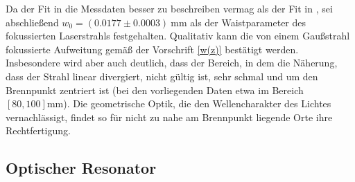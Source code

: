 \documentclass[11pt,a4paper,oneside]{scrartcl}
\begin{document}
Da der Fit in  die Messdaten besser zu beschreiben vermag als  der Fit in , sei abschließend $w_0=(0.0177\pm0.0003)\ \mathrm{mm}$ als der Waistparameter des fokussierten Laserstrahls festgehalten. Qualitativ kann die von einem Gaußstrahl fokussierte Aufweitung gemäß der Vorschrift \ref{w(z)} bestätigt werden. Insbesondere wird aber auch deutlich, dass der Bereich, in dem die Näherung, dass der Strahl linear divergiert, nicht gültig ist, sehr schmal und um den Brennpunkt zentriert ist (bei den vorliegenden Daten etwa im Bereich $[80,100]\mathrm{mm}$). Die geometrische Optik, die den Wellencharakter des Lichtes vernachlässigt, findet so für nicht zu nahe am Brennpunkt liegende Orte ihre Rechtfertigung. 
\subsection{Optischer Resonator}
\end{document}
